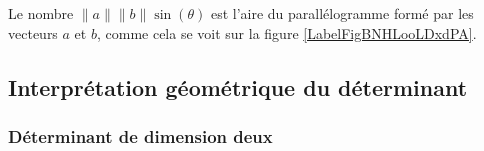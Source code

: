 \begin{remark}      \label{RemaAireParalProdVect}
    Le nombre $\| a \|\| b \|\sin(\theta)$ est l'aire du parallélogramme formé par les vecteurs $a$ et $b$, comme cela se voit sur la figure \ref{LabelFigBNHLooLDxdPA}. %
\newcommand{\CaptionFigBNHLooLDxdPA}{Calculer l'aire d'un parallélogramme.}


\end{remark}

\subsection{Interprétation géométrique du déterminant}

\subsubsection{Déterminant de dimension deux}

